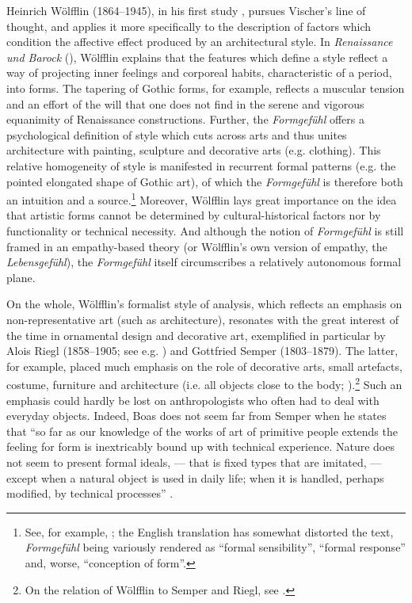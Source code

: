 \documentclass[output=paper]{langscibook}
\begin{document}
Heinrich Wölfflin (1864--1945), in his first study \citet{Wolfflin1886}, pursues Vischer's line of thought, and applies it more specifically to the description of factors which condition the affective effect produced by an architectural style. In \emph{Renaissance und Barock} (\citeyear{Wolfflin1888}), Wölfflin explains that the features which define a style reflect a way of projecting inner feelings and corporeal habits, characteristic of a period, into forms. The tapering of Gothic forms, for example, reflects a muscular tension and an effort of the will that one does not find in the serene and vigorous equanimity of Renaissance  constructions. Further, the \emph{Formgefühl} offers a psychological definition of style which cuts across arts and thus unites architecture with painting, sculpture and decorative arts (e.g. clothing). This relative homogeneity of style is manifested in recurrent formal patterns (e.g. the pointed elongated shape of Gothic art), of which the \emph{Formgefühl} is therefore both an intuition and a source.\footnote{See, for example, \citet[chap. 3]{Wolfflin1888}; the English translation has somewhat distorted the text, \emph{Formgefühl} being variously rendered as ``formal sensibility'', ``formal response'' and, worse, ``conception of form''.} Moreover, Wölfflin lays great importance on the idea that artistic forms cannot be determined by cultural-historical factors nor by functionality or technical necessity. And although the notion of \emph{Formgefühl} is still framed in an empathy-based theory (or Wölfflin's own version of empathy, the \emph{Lebensgefühl}), the \emph{Formgefühl} itself circumscribes a relatively autonomous formal plane.

On the whole, Wölfflin's formalist style of analysis, which reflects an emphasis on non-representative art (such as architecture), resonates with the great interest of the time in ornamental design and decorative art, exemplified in particular by Alois Riegl (1858--1905; see e.g. \citealt{Riegl1893}) and Gottfried Semper (1803--1879). The latter, for example, placed much emphasis on the role of decorative arts, small artefacts, costume, furniture and architecture (i.e. all objects close to the body; \citealt{Semper1884}).\footnote{On the relation of Wölfflin to Semper and Riegl, see \citet{Payne2012}.} Such an emphasis could hardly be lost on anthropologists who often had to deal with everyday objects. Indeed, Boas does not seem far from Semper when he states that ``so far as our knowledge of the works of art of primitive people extends the feeling for form is inextricably bound up with technical experience. Nature does not seem to present formal ideals, — that is fixed types that are imitated, — except when a natural object is used in daily life; when it is handled, perhaps modified, by technical processes'' \citep[11]{Boas1927}.
\end{document}
